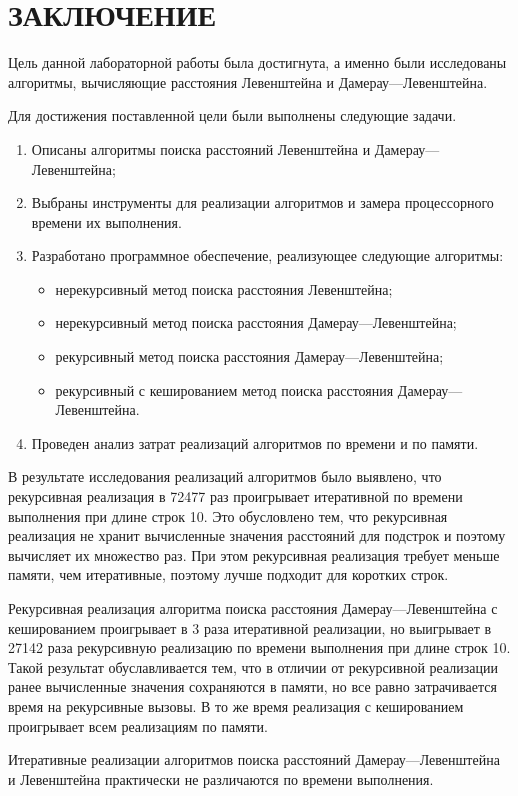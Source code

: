 \chapter*{ЗАКЛЮЧЕНИЕ}

Цель данной лабораторной работы была достигнута, а именно были исследованы алгоритмы, вычисляющие расстояния Левенштейна и Дамерау---Левенштейна.

Для достижения поставленной цели были выполнены следующие задачи.
\begin{enumerate}
	\item Описаны алгоритмы поиска расстояний Левенштейна и \newline Дамерау---Левенштейна;
	\item Выбраны инструменты для реализации алгоритмов и замера процессорного времени их выполнения.
	\item Разработано программное обеспечение, реализующее следующие алгоритмы:
	\begin{itemize}
		\item нерекурсивный метод поиска расстояния Левенштейна;
		\item нерекурсивный метод поиска расстояния Дамерау---Левенштейна;
		\item рекурсивный метод поиска расстояния Дамерау---Левенштейна;
		\item рекурсивный с кешированием метод поиска расстояния Дамерау---Левенштейна.
	\end{itemize}
	\item Проведен анализ затрат реализаций алгоритмов по времени и по памяти. 
\end{enumerate}

В результате исследования реализаций алгоритмов было выявлено, что рекурсивная реализация в 72477 раз проигрывает итеративной по времени выполнения при длине строк 10. 
Это обусловлено тем, что рекурсивная реализация не хранит вычисленные значения расстояний для подстрок и поэтому вычисляет их множество раз. 
При этом рекурсивная реализация требует меньше памяти, чем итеративные, поэтому лучше подходит для коротких строк. 

Рекурсивная реализация алгоритма поиска расстояния Дамерау---Левенштейна с кешированием проигрывает в 3 раза итеративной реализации, но выигрывает в 27142 раза рекурсивную реализацию по времени выполнения при длине строк 10. 
Такой результат обуславливается тем, что в отличии от рекурсивной реализации ранее вычисленные значения сохраняются в памяти, но все равно затрачивается время на рекурсивные вызовы. 
В то же время реализация с кешированием проигрывает всем реализациям по памяти.

Итеративные реализации алгоритмов поиска расстояний Дамерау---Левенштейна и Левенштейна практически не различаются по времени выполнения.

